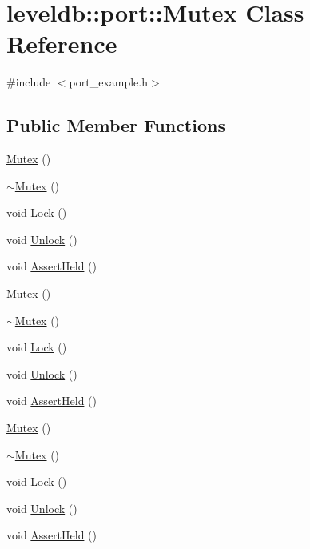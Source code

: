 \hypertarget{classleveldb_1_1port_1_1_mutex}{}\section{leveldb\+:\+:port\+:\+:Mutex Class Reference}
\label{classleveldb_1_1port_1_1_mutex}


{\ttfamily \#include $<$port\+\_\+example.\+h$>$}

\subsection*{Public Member Functions}
\begin{DoxyCompactItemize}
\item 
\hyperlink{classleveldb_1_1port_1_1_mutex_ab8f26966b881db1fd96839df85e5c583}{Mutex} ()
\item 
\hyperlink{classleveldb_1_1port_1_1_mutex_a86acffb44e6134be2e8398e6f3be6abc}{$\sim$\+Mutex} ()
\item 
void \hyperlink{classleveldb_1_1port_1_1_mutex_a9a4da7195ce1802c077bc4d0035d4dd1}{Lock} ()
\item 
void \hyperlink{classleveldb_1_1port_1_1_mutex_a9d69a21c53dad7732b2006acf87f006b}{Unlock} ()
\item 
void \hyperlink{classleveldb_1_1port_1_1_mutex_a9793393529f59bbb4adaf152bbbab42c}{Assert\+Held} ()
\item 
\hyperlink{classleveldb_1_1port_1_1_mutex_ab8f26966b881db1fd96839df85e5c583}{Mutex} ()
\item 
\hyperlink{classleveldb_1_1port_1_1_mutex_a86acffb44e6134be2e8398e6f3be6abc}{$\sim$\+Mutex} ()
\item 
void \hyperlink{classleveldb_1_1port_1_1_mutex_a9a4da7195ce1802c077bc4d0035d4dd1}{Lock} ()
\item 
void \hyperlink{classleveldb_1_1port_1_1_mutex_a9d69a21c53dad7732b2006acf87f006b}{Unlock} ()
\item 
void \hyperlink{classleveldb_1_1port_1_1_mutex_a9793393529f59bbb4adaf152bbbab42c}{Assert\+Held} ()
\item 
\hyperlink{classleveldb_1_1port_1_1_mutex_ab8f26966b881db1fd96839df85e5c583}{Mutex} ()
\item 
\hyperlink{classleveldb_1_1port_1_1_mutex_a86acffb44e6134be2e8398e6f3be6abc}{$\sim$\+Mutex} ()
\item 
void \hyperlink{classleveldb_1_1port_1_1_mutex_a9a4da7195ce1802c077bc4d0035d4dd1}{Lock} ()
\item 
void \hyperlink{classleveldb_1_1port_1_1_mutex_a9d69a21c53dad7732b2006acf87f006b}{Unlock} ()
\item 
void \hyperlink{classleveldb_1_1port_1_1_mutex_a9793393529f59bbb4adaf152bbbab42c}{Assert\+Held} ()
\end{DoxyCompactItemize}
